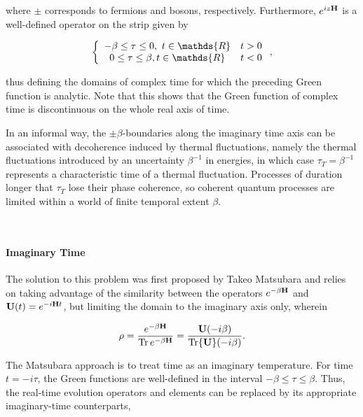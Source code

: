 where $\pm$ corresponds to fermions and bosons, respectively. Furthermore, $e^{iz {\bf H}}$ is a well-defined operator on the strip given by 

\begin{equation}
    \left\{\begin{array}{cc}
         -\beta \leq \tau \leq 0, \blanky t \in \mathds{R} & t > 0 \\
         0 \leq \tau \leq \beta, t \in \mathds{R} & t < 0 
    \end{array} \right.,
\end{equation}

thus defining the domains of complex time for which the preceding Green function is analytic. Note that this shows that the Green function of complex time is discontinuous on the whole real axis of time. 

\begin{tcolorbox}[title = Physical Context, colback = yellow]

In an informal way, the $\pm \beta$-boundaries along the imaginary time axis can be associated with decoherence induced by thermal fluctuations, namely the thermal fluctuations introduced by an uncertainty $\beta^{-1}$ in energies, in which case $\tau_T = \beta^{-1}$ represents a characteristic time of a thermal fluctuation. Processes of duration longer that $\tau_T$ lose their phase coherence, so coherent quantum processes are limited within a world of finite temporal extent $\beta$. 

\end{tcolorbox}

\blanky \\

\paragraph{Imaginary Time}

The solution to this problem was first proposed by Takeo Matsubara and relies on taking advantage of the similarity between the operators $e^{-\beta {\bf H}}$ and ${\bf U}(t) = e^{-i {\bf H} t}$, but limiting the domain to the imaginary axis only, wherein 

$$
    \rho = \frac{e^{-\beta {\bf H}}}{\Tr e^{-\beta {\bf H}}} = \frac{{\bf U}(-i\beta)}{\Tr {\bf U}(-i\beta)}.
$$

The Matsubara approach is to treat time as an imaginary temperature. For time $t = -i\tau$, the Green functions are well-defined in the interval $-\beta \leq \tau \leq \beta$. Thus, the real-time evolution operators and elements can be replaced by its appropriate imaginary-time counterparts,

